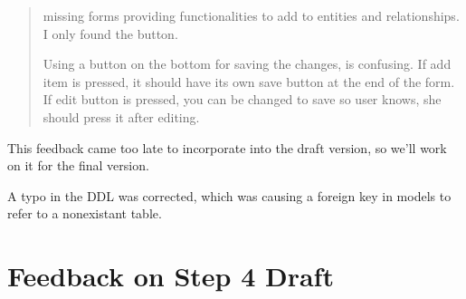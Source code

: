 \documentclass[11pt,letterpaper,oneside]{amsart}
\begin{document}
\begin{quotation}
missing forms providing functionalities to add to entities and relationships. I only found the button.

Using a button on the bottom for saving the changes, is confusing.  If add item is pressed, it should have its own save button at the end of the form. If edit button is pressed, you can be changed to save so user knows, she should press it after editing.

\end{quotation}

This feedback came too late to incorporate into the draft version, so we'll work on it for the final version.

A typo in the DDL was corrected, which was causing a foreign key in models to refer to a nonexistant table.


\section*{Feedback on Step 4 Draft}
\end{document}

